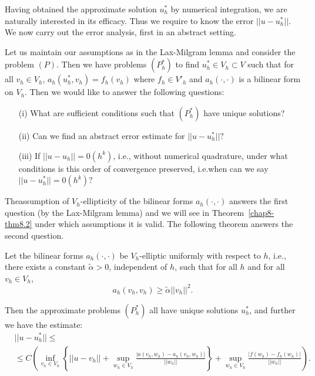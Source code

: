 Having obtained the approximate solution $u^{*}_{h}$ by numerical
integration, we are naturally interested in its efficacy. Thus we
require to know the error $||u-u^{*}_{h}||$. We now carry out the
error analysis, first in an abstract setting.

Let us maintain our assumptions as in the Lax-Milgram lemma and
consider the problem $(P)$. Then we have problems $(P^{*}_{h})$ to
find $u^{*}_{h}\in V_{h}\subset V$ such that for all $v_{h}\in V_{h}$,
$a_{h}(u^{*}_{h},v_{h})=f_{h}(v_{h})$ where $f_{h}\in V'_{h}$ and
$a_{h}(\cdot,\cdot)$ is a bilinear form on $V_{h}$. Then we would like
to answer the following questions:
\begin{itemize}
\item[(i)] What are sufficient conditions such that $(P^{*}_{h})$ have
  unique solutions?

\item[(ii)] Can we find an abstract error estimate for
  $||u-u^{*}_{h}||?$

\item[(iii)] If $||u-u_{h}||=0(h^{k})$, i.e., without numerical
  quadrature, under what conditions is this order of convergence
  preserved, i.e.\@ when can we say $||u-u^{*}_{h}||=0(h^{k})?$ 
\end{itemize}

The\pageoriginale assumption of $V_{h}$-ellipticity of the bilinear
forms $a_{h}(\cdot,\cdot)$ answers the first question (by the
Lax-Milgram lemma) and we will see in Theorem~\ref{chap8-thm8.2} under
which assumptions it is valid. The following theorem answers the
second question.

\begin{theorem}\label{chap8-thm8.1}
Let the bilinear forms $a_{h}(\cdot,\cdot)$ be $V_{h}$-elliptic
uniformly with respect to $h$, i.e., there exists a constant
$\widetilde{\alpha}>0$, independent of $h$, such that for all $h$ and
for all $v_{h}\in V_{h}$,
\begin{equation*}
a_{h}(v_{h},v_{h})\geq
\widetilde{\alpha}||v_{h}||^{2}.\tag{8.20}\label{chap8-eq8.20} 
\end{equation*}

Then the approximate problems $(P^{*}_{h})$ all have unique solutions
$u^{*}_{h}$, and further we have the estimate:
{\fontsize{9pt}{11pt}\selectfont
\begin{equation*}
\begin{split}
& ||u-u^{*}_{h}||\leq\\
& \leq C\left(\inf\limits_{v_{h}\in
    V_{h}}\left\{||u-v_{h}||+\sup\limits_{w_{h}\in
    V_{h}}\frac{|a(v_{h},w_{h})-a_{h}(v_{h},w_{h})|}{||w_{h}||}\right\}+\sup\limits_{w_{h}\in V_{h}}\frac{|f(w_{h})-f_{h}(w_{h})|}{||w_{h}||}\right).
\end{split}\tag{8.21}\label{chap8-eq8.21} 
\end{equation*}}\relax
\end{theorem}

